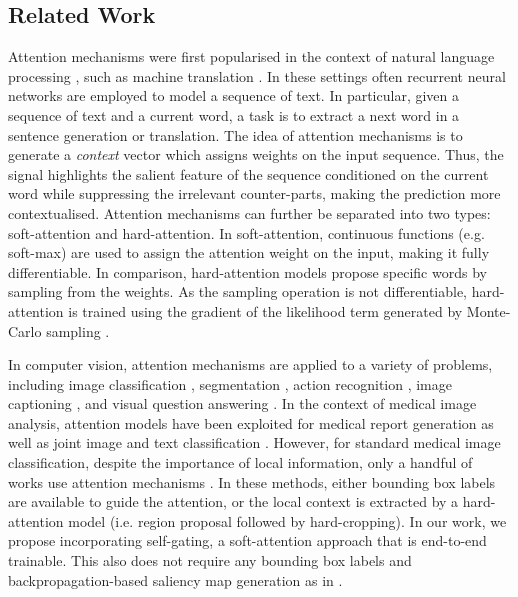 \documentclass{article}
\begin{document}
\subsection{Related Work}

Attention mechanisms were first popularised in the context of natural language processing \cite{shen2017disan}, such as machine translation \cite{bahdanau2014neural, DBLP:journals/corr/LuongPM15}. In these settings often recurrent neural networks are employed to model a sequence of text. In particular, given a sequence of text and a current word, a task is to extract a next word in a sentence generation or translation. The idea of attention mechanisms is to generate a \emph{context} vector which assigns weights on the input sequence. Thus, the signal highlights the salient feature of the sequence conditioned on the current word while suppressing the irrelevant counter-parts, making the prediction more contextualised. Attention mechanisms can further be separated into two types: soft-attention and hard-attention. In soft-attention, continuous functions (e.g. soft-max) are used to assign the attention weight on the input, making it fully differentiable. In comparison, hard-attention models propose specific words by sampling from the weights. As the sampling operation is not differentiable, hard-attention is trained using the gradient of the likelihood term generated by Monte-Carlo sampling \cite{xu2015show}.

In computer vision, attention mechanisms are applied to a variety of problems, including image classification \cite{jetley2018learn, wang2017residual, zhao2017survey}, segmentation \cite{DBLP:journals/corr/RenZ16}, action recognition \cite{liu2017global,DBLP:journals/corr/PeiBTM16,wang2017non}, image captioning \cite{xu2015show, lu2017knowing}, and visual question answering \cite{DBLP:journals/corr/YangHGDS15, DBLP:journals/corr/NamHK16}. In the context of medical image analysis, attention models have been exploited for medical report generation \cite{zhang2017mdnet, zhang2017tandemnet} as well as joint image and text classification \cite{DBLP:journals/corr/abs-1801-04334}. However, for standard medical image classification, despite the importance of local information, only a handful of works use attention mechanisms  \cite{pesce2017learning, guan2018diagnose}. In these methods, either bounding box labels are available to guide the attention, or the local context is extracted by a hard-attention model (i.e. region proposal followed by hard-cropping). In our work, we propose incorporating self-gating, a soft-attention approach that is end-to-end trainable. This also does not require any bounding box labels and backpropagation-based saliency map generation as in \cite{baumgartner2016real}.
\end{document}
